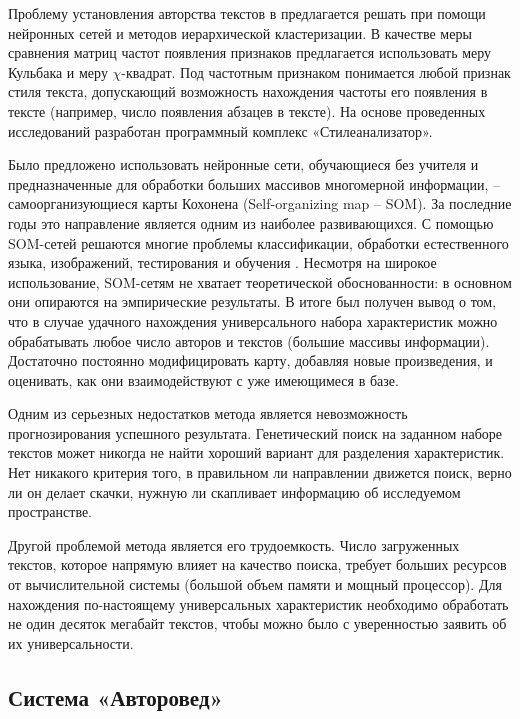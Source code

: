 Проблему установления авторства текстов в \cite{analyzator} предлагается решать при помощи нейронных сетей и методов иерархической кластеризации. В качестве меры сравнения матриц частот появления признаков предлагается использовать меру Кульбака и меру $\chi$-квадрат. Под частотным признаком понимается любой признак стиля текста, допускающий возможность нахождения частоты его появления в тексте (например, число появления абзацев в тексте). На основе проведенных исследований разработан программный комплекс «Стилеанализатор».

Было предложено использовать нейронные сети, обучающиеся без учителя и предназначенные для обработки больших массивов многомерной информации, – самоорганизующиеся карты Кохонена (Self-organizing map – SOM). За последние годы это направление является одним из наиболее развивающихся. С помощью SOM-сетей решаются многие проблемы классификации, обработки естественного языка, изображений, тестирования и обучения \cite{batura}. Несмотря на широкое использование, SOM-сетям не хватает теоретической обоснованности: в основном они опираются на эмпирические результаты. В итоге был получен вывод о том, что в случае удачного нахождения универсального набора характеристик можно обрабатывать любое число авторов и текстов (большие массивы информации). Достаточно постоянно модифицировать карту, добавляя новые произведения, и оценивать, как они взаимодействуют с уже имеющимеся в базе.

Одним из серьезных недостатков метода является невозможность прогнозирования успешного результата. Генетический поиск на заданном наборе текстов может никогда не найти хороший вариант для разделения характеристик. Нет никакого критерия того, в правильном ли направлении движется поиск, верно ли он делает скачки, нужную ли скапливает информацию об исследуемом пространстве. 

Другой проблемой метода является его трудоемкость. Число загруженных текстов, которое напрямую влияет на качество поиска, требует больших ресурсов от вычислительной системы (большой объем памяти и мощный процессор). Для нахождения по-настоящему универсальных характеристик необходимо обработать не один десяток мегабайт текстов, чтобы можно было с уверенностью заявить об их универсальности.

\subsection{Система «Авторовед»}

